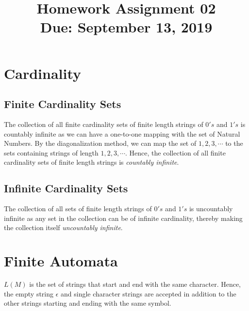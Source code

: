 \documentclass[11pt,letterpaper]{article}
\title{Homework Assignment 02 \\
    \small Due: September 13, 2019}
\begin{document}
\maketitle

\section{Cardinality}
\subsection{Finite Cardinality Sets}
The collection of all finite cardinality sets of finite length strings of $0's$ and $1's$ is countably infinite as we can have a one-to-one mapping with the set of Natural Numbers. By the diagonalization method, we can map the set of  $1,2,3,\cdots$ to the sets containing strings of length $1,2,3,\cdots$. Hence, the collection of all finite cardinality sets of finite length strings is \textit{countably infinite}.

\subsection{Infinite Cardinality Sets}
The collection of all sets of finite
length strings of $0's$ and $1's$ is uncountably infinite as any set in the collection can be of infinite cardinality, thereby making the collection itself \textit{uncountably infinite}.

\section{Finite Automata}
\label{sec:s2}
$L(M)$ is the set of strings that start and end with the same character. Hence, the empty string $\epsilon$ and single character strings are accepted in addition to the other strings starting and ending with the same symbol.
\end{document}
